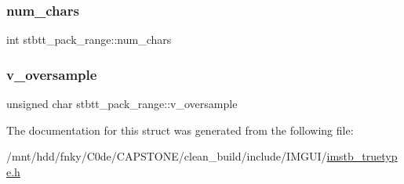 \mbox{\label{structstbtt__pack__range_a046d65b6ffb65fb998d471ba098e2e23}} 
\subsubsection{\texorpdfstring{num\+\_\+chars}{num\_chars}}
{\footnotesize\ttfamily int stbtt\+\_\+pack\+\_\+range\+::num\+\_\+chars}

\mbox{\label{structstbtt__pack__range_a6288f14006e257544db3d015c32b4113}} 
\subsubsection{\texorpdfstring{v\+\_\+oversample}{v\_oversample}}
{\footnotesize\ttfamily unsigned char stbtt\+\_\+pack\+\_\+range\+::v\+\_\+oversample}



The documentation for this struct was generated from the following file\+:\begin{DoxyCompactItemize}
\item 
/mnt/hdd/fnky/\+C0de/\+C\+A\+P\+S\+T\+O\+N\+E/clean\+\_\+build/include/\+I\+M\+G\+U\+I/\hyperlink{imstb__truetype_8h}{imstb\+\_\+truetype.\+h}\end{DoxyCompactItemize}
